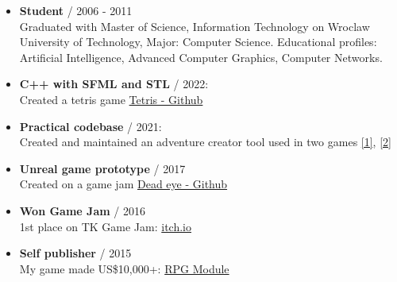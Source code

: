 \documentclass[12pt,a4paper]{article}
\begin{document}
\begin{multicols}{2}
\begin{samepage}
\begin{itemize}[leftmargin=*]
%
	\item \textbf{Student} / 2006 - 2011 \\
		Graduated with Master of Science, Information Technology on Wroclaw University of Technology, Major: Computer Science. Educational profiles: Artificial Intelligence, Advanced Computer Graphics, Computer Networks. \\
\end{itemize}

\end{samepage}

\vfill 

\centering

\begin{itemize}[leftmargin=4.5cm]
	\section*{Achievements}
	\setlength\itemsep{0.0cm}
	\item \textbf{C++ with SFML and STL} / 2022: \\
		Created a tetris game {\href{https://github.com/kbobnis/tetris}{Tetris - Github}}
	\item \textbf{Practical codebase} / 2021: \\
		Created and maintained an adventure creator tool used in two games {\href{https://play.google.com/store/apps/details?id=games.dali.adventure.neighborhood.unholy}{[1]}}, {\href{https://play.google.com/store/apps/details?id=games.dali.adventure.reborn}{[2]}}
	\item \textbf{Unreal game prototype} / 2017  \\
		 Created on a game jam  {\href{https://github.com/kbobnis/2017.05-TSG-Compo---Dead-eye}{Dead eye - Github}}
	\item \textbf{Won Game Jam} / 2016   \\
		1st place on TK Game Jam: {\href{https://itch.io/jam/tk-game-jam-2016/results}{itch.io}} 
	\item \textbf{Self publisher} / 2015 \\
		 My game made US\$10,000+: {\href{https://play.google.com/store/apps/details?id=com.wyspianStudios.rpgModuleFull}{RPG Module}} 
\end{itemize}



\end{multicols}
\end{document}
